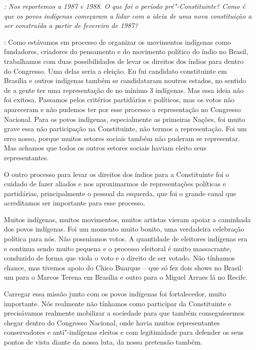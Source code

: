 \emph{: Nos reportemos a 1987 e 1988. O que foi o período
pré"-Constituinte? Como é que os povos indígenas começaram a lidar com a
ideia de uma nova constituição a ser construída a partir de fevereiro de
1987?}

: Como estávamos em processo de organizar os movimentos
indígenas como fundadores, criadores do pensamento e do movimento
político do índio no Brasil, trabalhamos com duas possibilidades de
levar os direitos dos índios para dentro do Congresso. Uma delas seria a
eleição. Eu fui candidato constituinte em Brasília e outros indígenas
também se candidataram noutros estados, no sentido de a gente ter uma
representação de no mínimo 3 indígenas. Mas essa ideia não foi exitosa.
Passamos pelos critérios partidários e políticos, mas os votos não
apareceram e não pudemos ter por esse processo a representação no
Congresso Nacional. Para os povos indígenas, especialmente as primeiras
Nações, foi muito grave essa não participação na Constituinte, não
termos a representação. Foi um erro nosso, porque muitos setores sociais
também não puderam se representar. Mas achamos que todos os outros
setores sociais haviam eleito seus representantes.

O outro processo para levar os direitos dos índios para a Constituinte
foi o cuidado de fazer aliados e nos aproximarmos de representações
políticas e partidárias, principalmente o pessoal da esquerda, que foi o
grande canal que acreditamos ser importante para esse processo.

Muitos indígenas, muitos movimentos, muitos artistas vieram apoiar a
caminhada dos povos indígenas. Foi um momento muito bonito, uma
verdadeira celebração política para nós. Não possuíamos votos. A
quantidade de eleitores indígenas era e continua sendo muito pequena e o
processo eleitoral é muito massacrante, conduzido de forma que viola o
voto e o direito de ser votado. Não tínhamos chance, mas tivemos apoio
do Chico Buarque -- que só fez dois shows no Brasil: um para o Marcos
Terena em Brasília e outro para o Miguel Arraes lá no Recife.

Carregar essa missão junto com os povos indígenas foi fortalecedor,
muito importante. Nós realmente não tínhamos como participar da
Constituinte e precisávamos realmente mobilizar a sociedade para que
também conseguíssemos chegar dentro do Congresso Nacional, onde havia
muitos representantes conservadores e anti"-indígenas eleitos e com
legitimidade para defender os seus pontos de vista diante da nossa luta,
da nossa pretensão também.

